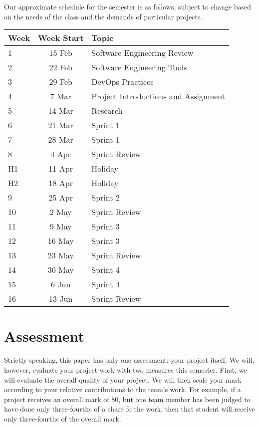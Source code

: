 \documentclass{article}
\begin{document}
Our approximate schedule for the semester is as follows, subject to change based on the needs of the class and the demands of particular projects.

\medskip

\renewcommand{\arraystretch}{1.5}
\begin{tabular}{|l|c|l|}
\hline
 Week & Week Start & Topic                                \\ \hline
 1    & 15 Feb     & Software Engineering Review          \\ \hline
 2    & 22 Feb     & Software Engineering Tools           \\ \hline
 3    & 29 Feb     & DevOps Practices                     \\ \hline
 4    &  7 Mar     & Project Introductions and Assignment \\ \hline
 5    & 14 Mar     & Research                             \\ \hline
 6    & 21 Mar     & Sprint 1                             \\ \hline
 7    & 28 Mar     & Sprint 1                             \\ \hline
 8    &  4 Apr     & Sprint Review                        \\ \hline
 H1   & 11 Apr     & Holiday                              \\ \hline
 H2   & 18 Apr     & Holiday                              \\ \hline
 9    & 25 Apr     & Sprint 2                             \\ \hline
 10   &  2 May     & Sprint Review                        \\ \hline
 11   &  9 May     & Sprint 3                             \\ \hline
 12   & 16 May     & Sprint 3                             \\ \hline
 13   & 23 May     & Sprint Review                        \\ \hline
 14   & 30 May     & Sprint 4                             \\ \hline
 15   &  6 Jun     & Sprint 4                             \\ \hline
 16   & 13 Jun     & Sprint Review                        \\ \hline
\end{tabular}



\section*{Assessment}
Strictly speaking, this paper has only one assessment: your project itself. We will, however, evaluate your project work with two measures this semester. First, we will evaluate the overall quality of your project. We will then scale your mark according to your relative contributions to the team's work. For example, if a project receives an overall mark of 80, but one team member has been judged to have done only three-fourths of a share fo the work, then that student will receive only three-fourths of the overall mark.
\end{document}
